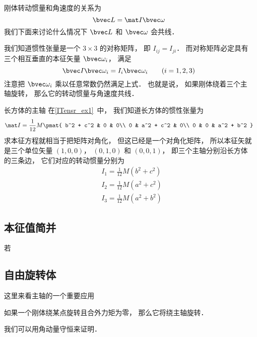 
\begin{issues}
\issueDraft
\end{issues}


刚体转动惯量和角速度的关系为
\begin{equation}
\bvec L = \mat I \bvec \omega
\end{equation}
我们下面来讨论什么情况下 $\bvec L$ 和 $\bvec \omega$ 会共线．

我们知道惯性张量是一个 $3\times 3$ 的对称矩阵， 即 $I_{ij} = I_{ji}$． 而对称矩阵必定具有三个相互垂直的本征矢量 $\bvec \omega_i$， 满足
\begin{equation}
\bvec I \bvec \omega_i = I_i \bvec \omega_i \qquad (i = 1,2,3)
\end{equation}
注意把 $\bvec \omega_i$ 乘以任意常数仍然满足上式． 也就是说， 如果刚体绕着三个主轴旋转， 那么它的转动惯量与角速度共线．

\begin{example}{长方体的主轴}
在\autoref{ITensr_ex1}~中， 我们知道长方体的惯性张量为
\begin{equation}
\mat I = \frac{1}{12} M
\pmat{
   b^2 + c^2 & 0 & 0\\
   0 & a^2 + c^2 & 0\\
   0 & 0 & a^2 + b^2
}
\end{equation}
求本征方程就相当于把矩阵对角化， 但这已经是一个对角化矩阵， 所以本征矢就是三个单位矢量 $(1,0,0)$， $(0,1,0)$ 和 $(0,0,1)$， 即三个主轴分别沿长方体的三条边， 它们对应的转动惯量分别为
\begin{equation}
\begin{aligned}
&I_1 = \frac{1}{12}M(b^2+c^2)\\
&I_2 = \frac{1}{12}M(a^2+c^2)\\
&I_3 = \frac{1}{12}M(a^2+b^2)
\end{aligned}
\end{equation}
\end{example}

\subsection{本征值简并}
若 

\subsection{自由旋转体}
这里来看主轴的一个重要应用
\begin{theorem}{}
如果一个刚体绕某点旋转且合外力矩为零， 那么它将绕主轴旋转．
\end{theorem}
我们可以用角动量守恒来证明．
